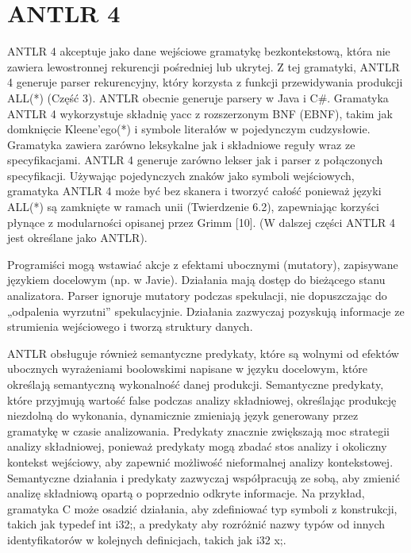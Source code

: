 \section{ANTLR 4}
ANTLR 4 akceptuje jako dane wejściowe gramatykę bezkontekstową, która nie
zawiera lewostronnej rekurencji pośredniej lub ukrytej. \footnotemark[2]
Z tej gramatyki, ANTLR 4 generuje parser rekurencyjny, który korzysta z funkcji
przewidywania produkcji ALL(*) (Część 3). ANTLR obecnie generuje parsery w Java
i C{\#}.
Gramatyka ANTLR 4 wykorzystuje składnię yacc z rozszerzonym BNF (EBNF),
takim jak domknięcie Kleene'ego(*) i symbole literałów w pojedynczym cudzysłowie.
Gramatyka zawiera zarówno leksykalne jak i składniowe reguły wraz ze specyfikacjami.
ANTLR 4 generuje zarówno lekser jak i parser z połączonych specyfikacji.
Używając pojedynczych znaków jako symboli wejściowych, gramatyka ANTLR 4
może być bez skanera i tworzyć całość ponieważ języki ALL(*) są zamknięte
w ramach unii (Twierdzenie 6.2), zapewniając korzyści płynące z modularności
opisanej przez Grimm [10]. (W dalszej części ANTLR 4 jest określane jako ANTLR).
\par
Programiści mogą wstawiać akcje z efektami ubocznymi (mutatory),
zapisywane językiem docelowym (np. w Javie). Działania mają dostęp do bieżącego
stanu analizatora. Parser ignoruje mutatory podczas spekulacji,
nie dopuszczając do „odpalenia wyrzutni” spekulacyjnie.
Działania zazwyczaj pozyskują informacje ze strumienia wejściowego
i tworzą struktury danych.
\par
ANTLR obsługuje również semantyczne predykaty, które są wolnymi
od efektów ubocznych wyrażeniami boolowskimi napisane w języku docelowym,
które określają semantyczną wykonalność danej produkcji.
Semantyczne predykaty, które przyjmują wartość false podczas analizy składniowej,
określając produkcję niezdolną do wykonania, dynamicznie zmieniają
język generowany przez gramatykę w czasie analizowania.\footnotemark[3]
Predykaty znacznie zwiększają moc strategii analizy składniowej, ponieważ
predykaty mogą zbadać stos analizy i okoliczny kontekst wejściowy,
aby zapewnić możliwość nieformalnej analizy kontekstowej.
Semantyczne działania i predykaty zazwyczaj współpracują ze sobą, aby
zmienić analizę składniową opartą o poprzednio odkryte informacje.
Na przykład, gramatyka C może osadzić działania, aby zdefiniować typ symboli
z konstrukcji, takich jak typedef int i32;, a predykaty aby rozróżnić nazwy
typów od innych identyfikatorów w kolejnych definicjach, takich jak i32 x;.
